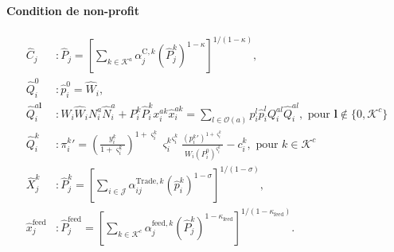 \paragraph{Condition de non-profit}
\begin{align}
	\hat{C}_j                & : \hat{P}_j = \left[ \sum_{k \in \mathcal{K}^a} \alpha_j^{\text{C},k} \left(\hat{P}_j^k\right)^{1- \kappa} \right]^{1/(1 - \kappa)},                                                                                                 \\
	\hat{Q}_i^0              & :\hat{p}_i^0=\hat{W}_i,                                                                                                                                                                                                              \\
	\hat{Q}_i^{a \mathbf{l}} & : W_i \hat{W}_i N_i^a \hat{N}_i^a + P_i^k \hat{P}_i^k x_i^{ak} \hat{x}_i^{ak} = \sum_{l\in \mathcal{O}(a)} p_i^l \hat{p}_i^l Q_i^{al} \hat{Q}_i^{al}, \text{ pour } \mathbf{l} \notin \{0, \mathcal{K}^c\}                           \\
	\hat{Q}_i^k              & : {\pi_i^k} \prime = \left( \frac{y_i^k}{1+\varsigma_i^k} \right)^{1+\varsigma_i^k} {\varsigma_i^k}^{\varsigma_i^k} \frac{({p_i^k}\prime)^{1+ \varsigma_i^k}}{W_i (P_i^0)^{\varsigma_i^k}} - c_i^k, \text{ pour } k\in \mathcal{K}^c \\
	\hat{X}_j^k              & : \hat{P}_j^k = \left[ \sum_{i \in \mathcal{J}} \alpha_{ij}^{\text{Trade},k} \left(\hat{p}_i^k\right)^{1 - \sigma} \right]^{1/(1 - \sigma)},                                                                                         \\
	\hat{x}_j^{\text{feed}}  & : \hat{P}_j^{\text{feed}} = \left[ \sum_{k \in\mathcal{K}^c} \alpha_j^{\text{feed},k} \left(\hat{P}_j^k\right)^{1 - \kappa_\text{feed}} \right]^{1/(1 - \kappa_\text{feed})}.
\end{align}

